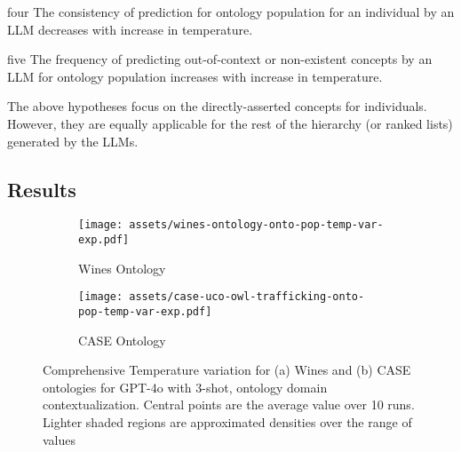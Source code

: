 \documentclass[a4paper,colorinlistoftodos]{article}
\begin{document}
\begin{hypothesis}{}{four}
  The consistency of prediction for ontology population for an individual by
  an LLM decreases with increase in temperature.
\end{hypothesis}

\begin{hypothesis}{}{five}
  The frequency of predicting out-of-context or non-existent concepts by an
  LLM for ontology population increases with increase in temperature.
\end{hypothesis}

The above hypotheses focus on the directly-asserted concepts for
individuals. However, they are equally applicable for the rest of the 
hierarchy (or ranked lists) generated by the LLMs.

\subsection{Results}
\label{subsec:new-temp-variation-results}

\begin{figure}
\begin{subfigure}{0.5\textwidth} \centering
    \caption{Wines Ontology}
    \label{fig:new-wines-temp-variation}
\texttt{[image: assets/wines-ontology-onto-pop-temp-var-exp.pdf]}
\end{subfigure} \hspace{0.2cm}
\begin{subfigure}{0.5\textwidth} \centering
    \caption{CASE Ontology}
    \label{fig:new-case-temp-variation}
\texttt{[image: assets/case-uco-owl-trafficking-onto-pop-temp-var-exp.pdf]}
\end{subfigure}
\caption{Comprehensive Temperature variation for (a) Wines and (b) CASE ontologies for
GPT-4o with 3-shot, ontology domain contextualization. Central
points are the average value over 10 runs. Lighter shaded regions are
approximated densities over the range of values}
\label{fig:new-temp-variation}
\end{figure}



\end{document}
